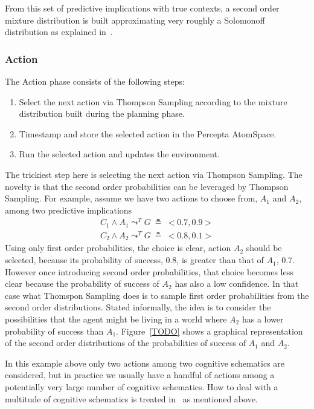 \documentclass[runningheads]{llncs}
\newcommand{\lpreimp}[1]{\leadsto^{#1}}
\begin{document}
From this set of predictive implications with true contexts, a second
order mixture distribution is built approximating very roughly a
Solomonoff distribution as explained in~\cite{TODO}.

\subsubsection{Action}

The Action phase consists of the following steps:
\begin{enumerate}
\item Select the next action via Thompson Sampling according to the
  mixture distribution built during the planning phase.
\item Timestamp and store the selected action in the Percepta
  AtomSpace.
\item Run the selected action and updates the environment.
\end{enumerate}

The trickiest step here is selecting the next action via Thompson
Sampling.  The novelty is that the second order probabilities can be
leveraged by Thompson Sampling.  For example, assume we have two
actions to choose from, $A_1$ and $A_2$, among two predictive
implications
$$
\begin{array}{c}
  C_1 \land A_1 \lpreimp{T} G\ \measeq\ <\!0.7, 0.9\!> \\
  C_2 \land A_2 \lpreimp{T} G\ \measeq\ <\!0.8, 0.1\!>
\end{array}
$$
Using only first order probabilities, the choice is clear, action
$A_2$ should be selected, because its probability of success, 0.8, is
greater than that of $A_1$, 0.7.  However once introducing second
order probabilities, that choice becomes less clear because the
probability of success of $A_2$ has also a low confidence.  In that
case what Thomspon Sampling does is to sample first order
probabilities from the second order distributions.  Stated informally,
the idea is to consider the possibilities that the agent might be
living in a world where $A_2$ has a lower probability of success than
$A_1$.  Figure~\ref{TODO} shows a graphical representation of the
second order distributions of the probabilities of success of $A_1$
and $A_2$.

In this example above only two actions among two cognitive schematics
are considered, but in practice we usually have a handful of actions
among a potentially very large number of cognitive schematics.  How to
deal with a multitude of cognitive schematics is treated
in~\cite{Geisweiller2018} as mentioned above.
\end{document}
